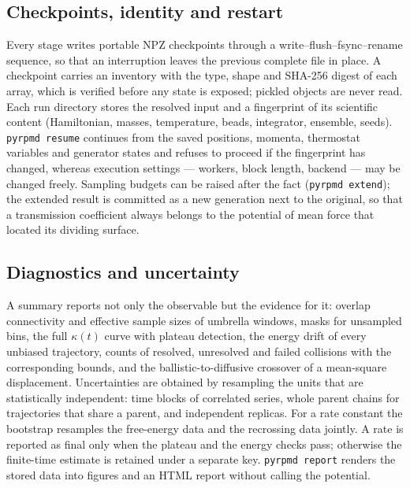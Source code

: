 \documentclass[preprint,12pt]{elsarticle}
\newcommand{\code}[1]{\texttt{#1}}
\begin{document}
\subsection{Checkpoints, identity and restart}

Every stage writes portable NPZ checkpoints through a write--flush--fsync--rename sequence, so that an interruption leaves the previous complete file in place. A checkpoint carries an inventory with the type, shape and SHA-256 digest of each array, which is verified before any state is exposed; pickled objects are never read. Each run directory stores the resolved input and a fingerprint of its scientific content (Hamiltonian, masses, temperature, beads, integrator, ensemble, seeds). \code{pyrpmd resume} continues from the saved positions, momenta, thermostat variables and generator states and refuses to proceed if the fingerprint has changed, whereas execution settings --- workers, block length, backend --- may be changed freely. Sampling budgets can be raised after the fact (\code{pyrpmd extend}); the extended result is committed as a new generation next to the original, so that a transmission coefficient always belongs to the potential of mean force that located its dividing surface.

\subsection{Diagnostics and uncertainty}

A summary reports not only the observable but the evidence for it: overlap connectivity and effective sample sizes of umbrella windows, masks for unsampled bins, the full $\kappa(t)$ curve with plateau detection, the energy drift of every unbiased trajectory, counts of resolved, unresolved and failed collisions with the corresponding bounds, and the ballistic-to-diffusive crossover of a mean-square displacement. Uncertainties are obtained by resampling the units that are statistically independent: time blocks of correlated series, whole parent chains for trajectories that share a parent, and independent replicas. For a rate constant the bootstrap resamples the free-energy data and the recrossing data jointly. A rate is reported as final only when the plateau and the energy checks pass; otherwise the finite-time estimate is retained under a separate key. \code{pyrpmd report} renders the stored data into figures and an HTML report without calling the potential.

\end{document}
